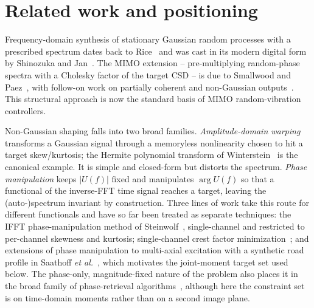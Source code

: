 \documentclass[10pt,a4paper]{article}
\numberwithin{equation}{section}
\begin{document}
\section*{Related work and positioning}

Frequency-domain synthesis of stationary Gaussian random processes with a prescribed spectrum dates back to Rice~\cite{rice1944mathematical} and was cast in its modern digital form by Shinozuka and Jan~\cite{shinozuka1972digital}. The MIMO extension -- pre-multiplying random-phase spectra with a Cholesky factor of the target CSD -- is due to Smallwood and Paez~\cite{smallwood1993coherent}, with follow-on work on partially coherent and non-Gaussian outputs~\cite{smallwood_nongaussian,cui2011matrix,hsueh1990generalized}. This structural approach is now the standard basis of MIMO random-vibration controllers.

Non-Gaussian shaping falls into two broad families. \emph{Amplitude-domain warping} transforms a Gaussian signal through a memoryless nonlinearity chosen to hit a target skew/kurtosis; the Hermite polynomial transform of Winterstein~\cite{winterstein1988nonlinear} is the canonical example. It is simple and closed-form but distorts the spectrum. \emph{Phase manipulation} keeps $|U(f)|$ fixed and manipulates $\arg U(f)$ so that a functional of the inverse-FFT time signal reaches a target, leaving the (auto-)spectrum invariant by construction. Three lines of work take this route for different functionals and have so far been treated as separate techniques: the IFFT phase-manipulation method of Steinwolf~\cite{steinwolf2011ifft,steinwolf2011twr,steinwolf_book_ngaussian}, single-channel and restricted to per-channel skewness and kurtosis; single-channel crest factor minimization~\cite{schroeder1970lowpeak,vanderouderaa1988peak,guillaume1991crest,retzler2022crest}; and extensions of phase manipulation to multi-axial excitation with a synthetic road profile in Saathoff \emph{et al.}~\cite{saathoff2006synthetic}, which motivates the joint-moment target set used below. The phase-only, magnitude-fixed nature of the problem also places it in the broad family of phase-retrieval algorithms~\cite{gerchberg1972practical,fienup1982phase}, although here the constraint set is on time-domain moments rather than on a second image plane.
\end{document}
